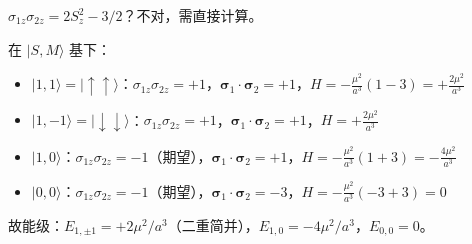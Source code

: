 \begin{derivationbox}
$\sigma_{1z}\sigma_{2z}=2S_z^2-3/2$？不对，需直接计算。

在 $|S,M\rangle$ 基下：
\begin{itemize}[nosep]
    \item $|1,1\rangle=|\uparrow\uparrow\rangle$：$\sigma_{1z}\sigma_{2z}=+1$，$\boldsymbol{\sigma}_1\cdot\boldsymbol{\sigma}_2=+1$，$H=-\frac{\mu^2}{a^3}(1-3)=+\frac{2\mu^2}{a^3}$
    \item $|1,-1\rangle=|\downarrow\downarrow\rangle$：$\sigma_{1z}\sigma_{2z}=+1$，$\boldsymbol{\sigma}_1\cdot\boldsymbol{\sigma}_2=+1$，$H=+\frac{2\mu^2}{a^3}$
    \item $|1,0\rangle$：$\sigma_{1z}\sigma_{2z}=-1$（期望），$\boldsymbol{\sigma}_1\cdot\boldsymbol{\sigma}_2=+1$，$H=-\frac{\mu^2}{a^3}(1+3)=-\frac{4\mu^2}{a^3}$
    \item $|0,0\rangle$：$\sigma_{1z}\sigma_{2z}=-1$（期望），$\boldsymbol{\sigma}_1\cdot\boldsymbol{\sigma}_2=-3$，$H=-\frac{\mu^2}{a^3}(-3+3)=0$
\end{itemize}

故能级：$E_{1,\pm1}=+2\mu^2/a^3$（二重简并），$E_{1,0}=-4\mu^2/a^3$，$E_{0,0}=0$。
\end{derivationbox}

\vspace{1em}
